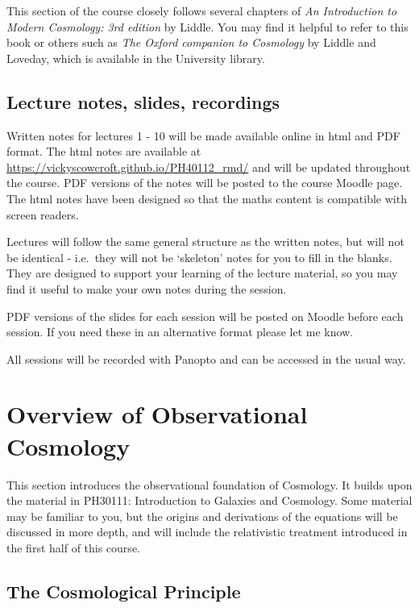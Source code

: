\documentclass[11pt,a4paper]{book}
\begin{document}
This section of the course closely follows several chapters of \emph{An
Introduction to Modern Cosmology: 3rd edition} by Liddle.
You may find it helpful to refer to this book or others such as \emph{The
Oxford companion to Cosmology} by Liddle and Loveday, which is
available in the University library.

\hypertarget{lecture-notes-slides-recordings}{%
\section*{Lecture notes, slides, recordings}\label{lecture-notes-slides-recordings}}

Written notes for lectures 1 - 10 will be made available online in html and PDF format. The html notes are available at \url{https://vickyscowcroft.github.io/PH40112_rmd/} and will be updated throughout the course. PDF versions of the notes will be posted to the course Moodle page. The html notes have been designed so that the maths content is compatible with screen readers.

Lectures will follow the same general structure as the written notes, but will not be identical - i.e.~they will not be `skeleton' notes for you to fill in the blanks. They are designed to support your learning of the lecture material, so you may find it useful to make your own notes during the session.

PDF versions of the slides for each session will be posted on Moodle before each session. If you need these in an alternative format please let me know.

All sessions will be recorded with Panopto and can be accessed in the usual way.

\hypertarget{ch:intro_obs}{%
\chapter{Overview of Observational Cosmology}\label{ch:intro_obs}}

This section introduces the observational foundation of Cosmology. It
builds upon the material in PH30111: Introduction to Galaxies and
Cosmology. Some material may be familiar to you, but the origins and
derivations of the equations will be discussed in more depth, and will
include the relativistic treatment introduced in the first half of this
course.

\hypertarget{sec:cosmoprinciple}{%
\section{The Cosmological Principle}\label{sec:cosmoprinciple}}
\end{document}
